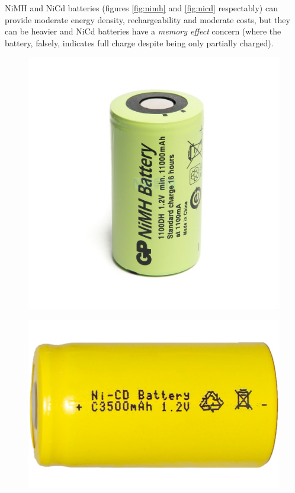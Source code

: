 \gls{NiMH} and \gls{NiCd} batteries (figures \ref{fig:nimh} and \ref{fig:nicd} respectably) can provide moderate energy density, rechargeability and moderate costs, but they can be heavier and \gls{NiCd} batteries have a \textit{memory effect} concern (where the battery, falsely, indicates full charge despite being only partially charged).
\begin{figure}[H]
    \centering
    \begin{minipage}{.5\textwidth}
        \centering
        \includegraphics[width=.5\linewidth]{ch3/assets/nimh.jpg}
        \label{fig:NiMH}
    \end{minipage}%
    \begin{minipage}{.5\textwidth}
        \centering
        \includegraphics[width=.5\linewidth]{ch3/assets/nicd.jpg}
        \label{fig:NiCd}
    \end{minipage}
\end{figure}

